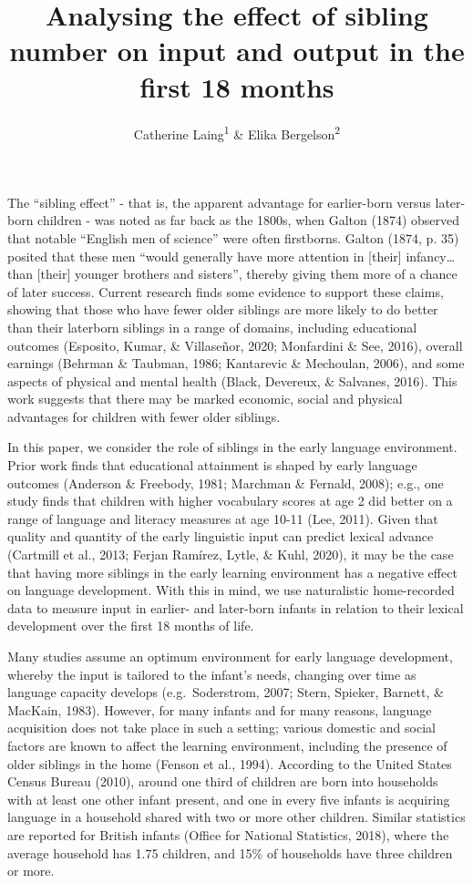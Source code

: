 \documentclass[
  english,
  man,floatsintext]{apa6}
\title{Analysing the effect of sibling number on input and output in the first 18 months}
\author{Catherine Laing\textsuperscript{1} \& Elika Bergelson\textsuperscript{2}}
\date{}
\affiliation{\vspace{0.5cm}\textsuperscript{1} Cardiff University, Cardiff, UK\\\textsuperscript{2} Duke University, Durham, NC, USA}
\begin{document}
\maketitle

The \enquote{sibling effect} - that is, the apparent advantage for earlier-born versus later-born children - was noted as far back as the 1800s, when Galton (1874) observed that notable \enquote{English men of science} were often firstborns. Galton (1874, p. 35) posited that these men \enquote{would generally have more attention in {[}their{]} infancy\ldots than {[}their{]} younger brothers and sisters}, thereby giving them more of a chance of later success. Current research finds some evidence to support these claims, showing that those who have fewer older siblings are more likely to do better than their laterborn siblings in a range of domains, including educational outcomes (Esposito, Kumar, \& Villaseñor, 2020; Monfardini \& See, 2016), overall earnings (Behrman \& Taubman, 1986; Kantarevic \& Mechoulan, 2006), and some aspects of physical and mental health (Black, Devereux, \& Salvanes, 2016). This work suggests that there may be marked economic, social and physical advantages for children with fewer older siblings.

In this paper, we consider the role of siblings in the early language environment. Prior work finds that educational attainment is shaped by early language outcomes (Anderson \& Freebody, 1981; Marchman \& Fernald, 2008); e.g., one study finds that children with higher vocabulary scores at age 2 did better on a range of language and literacy measures at age 10-11 (Lee, 2011). Given that quality and quantity of the early linguistic input can predict lexical advance (Cartmill et al., 2013; Ferjan Ramírez, Lytle, \& Kuhl, 2020), it may be the case that having more siblings in the early learning environment has a negative effect on language development. With this in mind, we use naturalistic home-recorded data to measure input in earlier- and later-born infants in relation to their lexical development over the first 18 months of life.

Many studies assume an optimum environment for early language development, whereby the input is tailored to the infant's needs, changing over time as language capacity develops (e.g.~Soderstrom, 2007; Stern, Spieker, Barnett, \& MacKain, 1983). However, for many infants and for many reasons, language acquisition does not take place in such a setting; various domestic and social factors are known to affect the learning environment, including the presence of older siblings in the home (Fenson et al., 1994). According to the United States Census Bureau (2010), around one third of children are born into households with at least one other infant present, and one in every five infants is acquiring language in a household shared with two or more other children. Similar statistics are reported for British infants (Office for National Statistics, 2018), where the average household has 1.75 children, and 15\% of households have three children or more.
\end{document}
